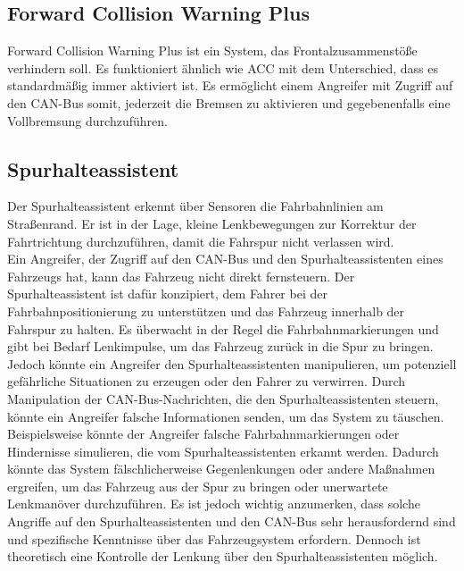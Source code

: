 \subsection{Forward Collision Warning Plus}
Forward Collision Warning Plus ist ein System, das Frontalzusammenstöße verhindern soll. Es funktioniert ähnlich wie \acs{ACC} mit dem Unterschied, dass es standardmäßig immer aktiviert ist. Es ermöglicht einem Angreifer mit Zugriff auf den \acs{CAN}-Bus somit, jederzeit die Bremsen zu aktivieren und gegebenenfalls eine Vollbremsung durchzuführen.

\subsection{Spurhalteassistent}
Der Spurhalteassistent erkennt über Sensoren die Fahrbahnlinien am Straßenrand. Er ist in der Lage, kleine Lenkbewegungen zur Korrektur der Fahrtrichtung durchzuführen, damit die Fahrspur nicht verlassen wird.\\
Ein Angreifer, der Zugriff auf den \acs{CAN}-Bus und den Spurhalteassistenten eines Fahrzeugs hat, kann das Fahrzeug nicht direkt fernsteuern. Der Spurhalteassistent ist dafür konzipiert, dem Fahrer bei der Fahrbahnpositionierung zu unterstützen und das Fahrzeug innerhalb der Fahrspur zu halten. Es überwacht in der Regel die Fahrbahnmarkierungen und gibt bei Bedarf Lenkimpulse, um das Fahrzeug zurück in die Spur zu bringen.
Jedoch könnte ein Angreifer den Spurhalteassistenten manipulieren, um potenziell gefährliche Situationen zu erzeugen oder den Fahrer zu verwirren. Durch Manipulation der \acs{CAN}-Bus-Nachrichten, die den Spurhalteassistenten steuern, könnte ein Angreifer falsche Informationen senden, um das System zu täuschen.
Beispielsweise könnte der Angreifer falsche Fahrbahnmarkierungen oder Hindernisse simulieren, die vom Spurhalteassistenten erkannt werden. Dadurch könnte das System fälschlicherweise Gegenlenkungen oder andere Maßnahmen ergreifen, um das Fahrzeug aus der Spur zu bringen oder unerwartete Lenkmanöver durchzuführen.
Es ist jedoch wichtig anzumerken, dass solche Angriffe auf den Spurhalteassistenten und den \acs{CAN}-Bus sehr herausfordernd sind und spezifische Kenntnisse über das Fahrzeugsystem erfordern. Dennoch ist theoretisch eine Kontrolle der Lenkung über den Spurhalteassistenten möglich.

